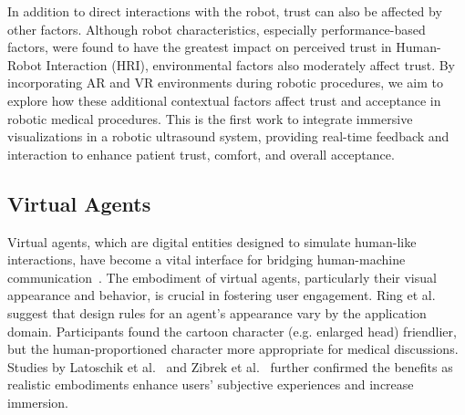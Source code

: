 In addition to direct interactions with the robot, trust can also be affected by other factors.   Although robot characteristics, especially performance-based factors, were found to have the greatest impact on perceived trust in Human-Robot Interaction (HRI), environmental factors also moderately affect trust. By incorporating AR and VR environments during robotic procedures, we aim to explore how these additional contextual factors affect trust and acceptance in robotic medical procedures. This is the first work to integrate immersive visualizations in a robotic ultrasound system, providing real-time feedback and interaction to enhance patient trust, comfort, and overall acceptance.

\subsection{Virtual Agents}

Virtual agents, which are digital entities designed to simulate human-like interactions, have become a vital interface for bridging human-machine communication~\cite{cassell2001embodied,nass2000machines}. The embodiment of virtual agents, particularly their visual appearance and behavior, is crucial in fostering user engagement. Ring et al.~\cite{ring2014right} suggest that design rules for an agent's appearance vary by the application domain. Participants found the cartoon character (e.g. enlarged head) friendlier, but the human-proportioned character more appropriate for medical discussions. Studies by Latoschik et al.~\cite{latoschik2017effect} and Zibrek et al.~\cite{zibrek2018effect} further confirmed the benefits as realistic embodiments enhance users’ subjective experiences and increase immersion.

